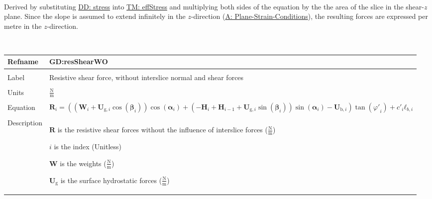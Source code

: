 \documentclass[12pt]{article}
\begin{document}
\paragraph{}
\label{GD:effNormFDeriv}
Derived by substituting \hyperref[DD:stress]{DD: stress} into \hyperref[TM:effStress]{TM: effStress} and multiplying both sides of the equation by the the area of the slice in the shear-$z$ plane. Since the slope is assumed to extend infinitely in the $z$-direction (\hyperref[assumpPSC]{A: Plane-Strain-Conditions}), the resulting forces are expressed per metre in the $z$-direction.
\par~

\noindent \begin{minipage}{\textwidth}
\begin{tabular}{>{\raggedright}p{}>{\raggedright\arraybackslash}p{}}
\toprule \textbf{Refname} & \textbf{GD:resShearWO}
\label{GD:resShearWO}
\\ \midrule \\
Label & Resistive shear force, without interslice normal and shear forces
\\ \midrule \\
Units & $\frac{\text{N}}{\text{m}}$
\\ \midrule \\
Equation & \begin{displaymath}
           {\mathbf{R}}_{i}=\left(\left({\mathbf{W}}_{i}+{\mathbf{U}_{\text{g},i}} \cos\left({\mathbf{β}}_{i}\right)\right) \cos\left({\mathbf{α}}_{i}\right)+\left(-{\mathbf{H}}_{i}+{\mathbf{H}}_{i-1}+{\mathbf{U}_{\text{g},i}} \sin\left({\mathbf{β}}_{i}\right)\right) \sin\left({\mathbf{α}}_{i}\right)-{\mathbf{U}_{\text{b},i}}\right) \tan\left({φ'}_{i}\right)+{c'}_{i} {\mathbf{ℓ}_{b,i}}
           \end{displaymath}
\\ \midrule \\
Description & \begin{symbDescription}
              \item{$\mathbf{R}$ is the resistive shear forces without the influence of interslice forces ($\frac{\text{N}}{\text{m}}$)}
              \item{$i$ is the index (Unitless)}
              \item{$\mathbf{W}$ is the weights ($\frac{\text{N}}{\text{m}}$)}
              \item{${\mathbf{U}_{\text{g}}}$ is the surface hydrostatic forces ($\frac{\text{N}}{\text{m}}$)}

\end{symbDescription}
\end{tabular}
\end{minipage}
\end{document}
